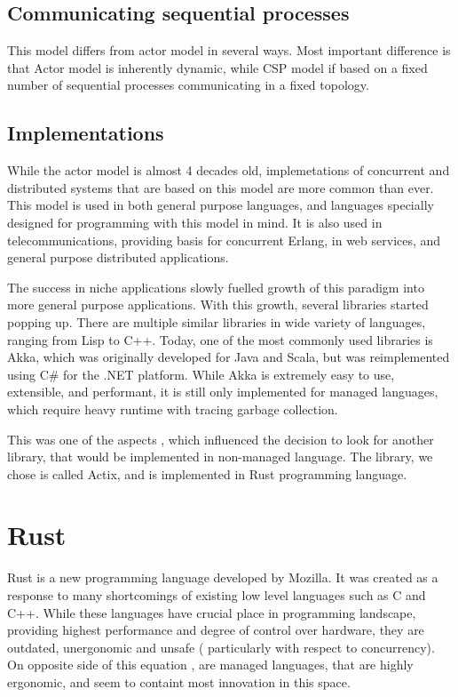 \subsection{Communicating sequential processes}
This model differs from actor model in several ways. Most important difference is that Actor model is inherently
dynamic, while CSP model if based on a fixed number of sequential processes communicating in a fixed topology\cite{Hoare:1985:CSP:3921}.

\subsection{Implementations}
While the actor model is almost 4 decades old, implemetations of concurrent and distributed systems that
are based on this model are more common than ever. This model is used in both general purpose languages, and
languages specially designed for programming with this model in mind. It is also used in telecommunications,
providing basis for concurrent Erlang, in web services, and general purpose distributed applications.

The success in niche applications slowly fuelled growth of this paradigm into more general purpose applications. With this
growth, several libraries started popping up. There are multiple similar libraries in
wide variety of languages, ranging from Lisp to C++. Today, one of the most commonly used libraries is Akka\cite{web:akka}, which was originally
developed for Java and Scala, but was reimplemented using C\# for the .NET platform. While Akka is extremely easy to use,
extensible, and performant, it is still only implemented for managed languages, which require heavy runtime with tracing garbage collection.

This was one of the aspects , which influenced the decision to look for another library, that would be implemented in
non-managed language. The library, we chose is called Actix\cite{web:actix}, and is implemented in Rust\cite{Blandy:2015:RPL:3019371}
programming language.

\section{Rust}
Rust is a new programming language developed by Mozilla. It was created as a response to many shortcomings of existing low level
languages such as C and C++. While these languages have crucial place in programming landscape, providing highest performance and
degree of control over hardware, they are outdated, unergonomic and unsafe ( particularly with respect to concurrency). On opposite
side of this equation , are managed languages, that are highly ergonomic, and seem to containt most innovation in this space.

